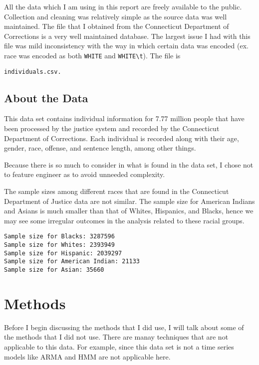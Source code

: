 \documentclass[11pt]{article}
\begin{document}
All the data which I am using in this report are freely available to the
public. Collection and cleaning was relatively simple as the source data
was well maintained. The file that I obtained from the Connecticut
Department of Corrections is a very well maintained database. The
largest issue I had with this file was mild inconsistency with the way
in which certain data was encoded (ex. race was encoded as both
\texttt{WHITE} and \texttt{WHITE\textbackslash{}t}). The file is

\begin{verbatim}
individuals.csv.
\end{verbatim}

\hypertarget{about-the-data}{%
\subsection{About the Data}\label{about-the-data}}

This data set contains individual information for 7.77 million people
that have been processed by the justice system and recorded by the
Connecticut Department of Corrections. Each individual is recorded along
with their age, gender, race, offense, and sentence length, among other
things.

Because there is so much to consider in what is found in the data set, I
chose not to feature engineer as to avoid unneeded complexity.

The sample sizes among different races that are found in the Connecticut
Department of Justice data are not similar. The sample size for American
Indians and Asians is much smaller than that of Whites, Hispanics, and
Blacks, hence we may see some irregular outcomes in the analysis related
to these racial groups.

    \begin{Verbatim}[commandchars=\\\{\}]
Sample size for Blacks: 3287596
Sample size for Whites: 2393949
Sample size for Hispanic: 2039297
Sample size for American Indian: 21133
Sample size for Asian: 35660

    \end{Verbatim}

    \hypertarget{methods}{%
\section{Methods}\label{methods}}

Before I begin discussing the methods that I did use, I will talk about
some of the methods that I did not use. There are manay techniques that
are not applicable to this data. For example, since this data set is not
a time series models like ARMA and HMM are not applicable here.
\end{document}
